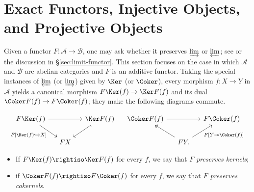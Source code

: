 
\section{Exact Functors, Injective Objects, and Projective Objects}\label{sec:inj-proj}
\hypertarget{o014.aljabr2.chapter2.exact-functors-injective-projective-objects}{ }

Given a functor $F: \mathcal{A} \to \mathcal{B}$, one may ask whether it
preserves $\varinjlim$ or $\varprojlim$; see \cite[\S 2.8]{Li1} or the
discussion in \S\ref{sec:limit-functor}. This section focuses on the case in
which $\mathcal{A}$ and $\mathcal{B}$ are abelian categories and $F$ is an
additive functor. Taking the special instances of $\varprojlim$ (or
$\varinjlim$) given by $\Ker$ (or $\Coker$), every morphism $f:X\to Y$ in
$\mathcal{A}$ yields a canonical morphism $F\Ker(f)\to\Ker F(f)$ and its dual
$\Coker F(f)\to F\Coker(f)$; they make the following diagrams commute.

\[\begin{tikzcd}[column sep=small]
	F \Ker(f) \arrow[rd, "{F[\Ker(f) \hookrightarrow X]}"'] \arrow[rr] & & \Ker F(f) \arrow[hookrightarrow, ld] \\
	& FX &
\end{tikzcd} \quad \begin{tikzcd}[column sep=small]
	\Coker F(f) \arrow[rr] & & F \Coker(f) \\
	& FY \arrow[twoheadrightarrow, lu] \arrow[ru, "{ F[Y \twoheadrightarrow \Coker(f)] }"'] . &
\end{tikzcd}\]

\begin{itemize}
	\item If $F\Ker(f)\rightiso\Ker F(f)$ for every $f$, we say that
	\emph{$F$ preserves kernels};
	\item if $\Coker F(f)\rightiso F\Coker(f)$ for every $f$, we say that
	\emph{$F$ preserves cokernels}.
\end{itemize}

